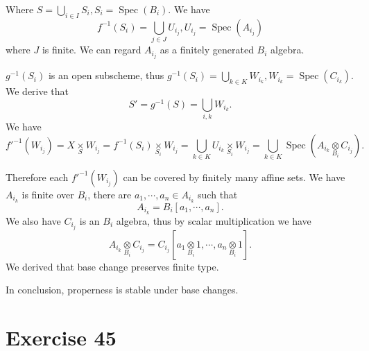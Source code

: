 \documentclass{article}
\numberwithin{equation}{section}
\DeclareMathOperator{\Spec}{Spec}
\newcommand{\fib}[1]{%
  \mathbin{\mathop{\times}\limits_{#1}}%
}
\newcommand{\tens}[1]{%
  \mathbin{\mathop{\otimes}\limits_{#1}}%
}
\begin{document}
Where $S=\bigcup_{i\in I} S_i,S_i = \Spec(B_i)$. We have
\begin{equation*}
f^{-1}(S_i) = \bigcup_{j\in J}U_{i_j}, U_{i_j} = \Spec(A_{i_j})
\end{equation*}
where $J$ is finite. We can regard $A_{i_j}$ as a finitely generated $B_i$ algebra.\\
\par $g^{-1}(S_i)$ is an open subscheme, thus $g^{-1}(S_i) = \bigcup_{k\in K}W_{i_k}, W_{i_k} = \Spec(C_{i_k})$. We derive that 
\begin{equation*}
S' = g^{-1}(S) = \bigcup_{i,k} W_{i_k}.
\end{equation*}
We have
\begin{equation*}
f'^{-1}(W_{i_j}) = X\fib{S}W_{i_j} = f^{-1}(S_i)\fib{S_i}W_{i_j} = \bigcup_{k\in K} U_{i_k}\fib{S_i}W_{i_j} = \bigcup_{k\in K} \Spec(A_{i_k}\tens{B_i}C_{i_j}).
\end{equation*}

Therefore each $f'^{-1}(W_{i_j})$ can be covered by finitely many affine sets. We have $A_{i_k}$ is finite over $B_i$, there are $a_1,\cdots,a_n\in A_{i_k}$ such that
\begin{equation*}
A_{i_k} = B_i[a_1,\cdots,a_n].
\end{equation*}
We also have $C_{i_j}$ is an $B_i$ algebra, thus by scalar multiplication we have
\begin{equation*}
A_{i_k}\tens{B_i}C_{i_j} = C_{i_j}[a_1\tens{B_i}1,\cdots,a_n\tens{B_i}1].
\end{equation*}
We derived that base change preserves finite type. \\
\par In conclusion, properness is stable under base changes.

\section*{Exercise 45}
\end{document}
